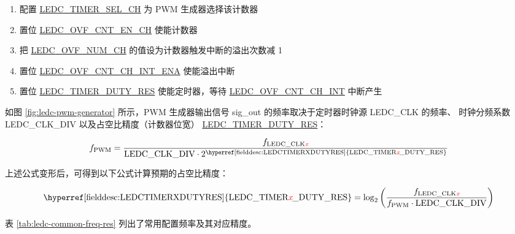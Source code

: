 \documentclass[main\_\_CN.tex]{subfiles}
\begin{document}
\begin{enumerate}
    \item 配置 \hyperref[fielddesc:LEDCTIMERSELCHN]{LEDC\_TIMER\_SEL\_CH} 为 PWM 生成器选择该计数器
    \item 置位 \hyperref[fielddesc:LEDCOVFCNTENCHN]{LEDC\_OVF\_CNT\_EN\_CH} 使能计数器
    \item 把 \hyperref[fielddesc:LEDCOVFNUMCHN]{LEDC\_OVF\_NUM\_CH} 的值设为计数器触发中断的溢出次数减 1
    \item 置位 \hyperref[fielddesc:LEDCOVFCNTCHNINTENA]{LEDC\_OVF\_CNT\_CH\_INT\_ENA} 使能溢出中断
    \item 置位 \hyperref[fielddesc:LEDCTIMERXDUTYRES]{LEDC\_TIMER\_DUTY\_RES} 使能定时器，等待 \hyperref[int:ledc-ovf-cnt]{LEDC\_OVF\_CNT\_CH\_INT} 中断产生
\end{enumerate}

如图 \ref{fig:ledc-pwm-generator} 所示，PWM 生成器输出信号 sig\_out 的频率取决于定时器时钟源 LEDC\_CLK 的频率、 时钟分频系数 LEDC\_CLK\_DIV 以及占空比精度（计数器位宽） \hyperref[fielddesc:LEDCTIMERXDUTYRES]{LEDC\_TIMER\_DUTY\_RES}：

    \[
    f_{\textrm{PWM}}=\frac{f_{\textrm{LEDC\_CLK\regindex{x}}}}
                        {\textrm{LEDC\_CLK\_DIV}\cdot 2^{\textrm{\hyperref[fielddesc:LEDCTIMERXDUTYRES]{LEDC\_TIMER\regindex{x}\_DUTY\_RES}}}}
    \]

上述公式变形后，可得到以下公式计算预期的占空比精度：

    \[
    \textrm{\hyperref[fielddesc:LEDCTIMERXDUTYRES]{LEDC\_TIMER\regindex{x}\_DUTY\_RES}}
    =\log_2\left(\frac{f_{\textrm{LEDC\_CLK\regindex{x}}}}
    {f_{\textrm{PWM}}\cdot \textrm{LEDC\_CLK\_DIV}}\right)
    \]

表 \ref{tab:ledc-common-freq-res} 列出了常用配置频率及其对应精度。
\end{document}
